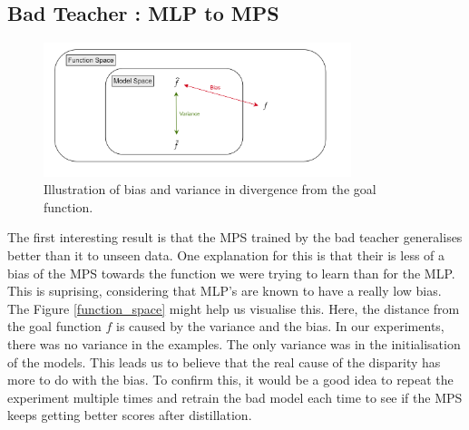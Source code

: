 \documentclass{article}
\theoremstyle{definition}
\theoremstyle{definition}
\begin{document}
\subsection{Bad Teacher : MLP to MPS}
\begin{figure}[hbt!]  \label{fig:function_space}
    \centering
    \caption{Illustration of bias and variance in divergence from the goal function.}
    \includegraphics[width=0.8\textwidth]{images/2023-04-21-16-47-59.png}
\end{figure}

The first interesting result is that the MPS trained by the bad teacher generalises better than it to unseen data. One explanation for this is that their is less of a bias of the MPS towards the function we were trying to learn than for the MLP. This is suprising, considering that MLP's are known to have a really low bias. The Figure \ref{function_space} might help us visualise this. Here, the distance from the goal function $f$ is caused by the variance and the bias. In our experiments, there was no variance in the examples. The only variance was in the initialisation of the models. This leads us to believe that the real cause of the disparity has more to do with the bias. To confirm this, it would be a good idea to repeat the experiment multiple times and retrain the bad model each time to see if the MPS keeps getting better scores after distillation.
\end{document}
